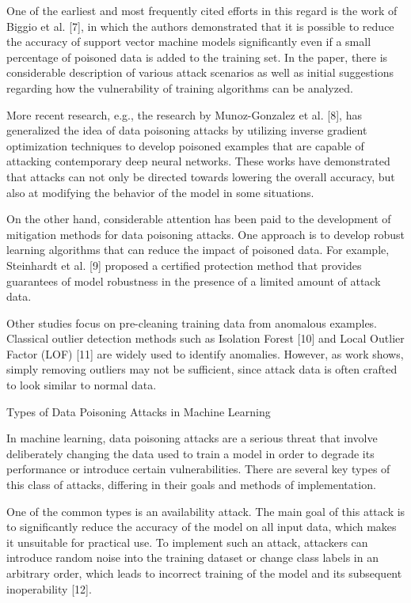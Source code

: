 One of the earliest and most frequently cited efforts in this regard is
the work of Biggio et al. {[}7{]}, in which the authors demonstrated
that it is possible to reduce the accuracy of support vector machine
models significantly even if a small percentage of poisoned data is
added to the training set. In the paper, there is considerable
description of various attack scenarios as well as initial suggestions
regarding how the vulnerability of training algorithms can be analyzed.

More recent research, e.g., the research by Munoz-Gonzalez et al.
{[}8{]}, has generalized the idea of data poisoning attacks by utilizing
inverse gradient optimization techniques to develop poisoned examples
that are capable of attacking contemporary deep neural networks. These
works have demonstrated that attacks can not only be directed towards
lowering the overall accuracy, but also at modifying the behavior of the
model in some situations.

On the other hand, considerable attention has been paid to the
development of mitigation methods for data poisoning attacks. One
approach is to develop robust learning algorithms that can reduce the
impact of poisoned data. For example, Steinhardt et al. {[}9{]} proposed
a certified protection method that provides guarantees of model
robustness in the presence of a limited amount of attack data.

Other studies focus on pre-cleaning training data from anomalous
examples. Classical outlier detection methods such as Isolation Forest
{[}10{]} and Local Outlier Factor (LOF) {[}11{]} are widely used to
identify anomalies. However, as work shows, simply removing outliers may
not be sufficient, since attack data is often crafted to look similar to
normal data.

Types of Data Poisoning Attacks in Machine Learning

In machine learning, data poisoning attacks are a serious threat that
involve deliberately changing the data used to train a model in order to
degrade its performance or introduce certain vulnerabilities. There are
several key types of this class of attacks, differing in their goals and
methods of implementation.

One of the common types is an availability attack. The main goal of this
attack is to significantly reduce the accuracy of the model on all input
data, which makes it unsuitable for practical use. To implement such an
attack, attackers can introduce random noise into the training dataset
or change class labels in an arbitrary order, which leads to incorrect
training of the model and its subsequent inoperability {[}12{]}.

